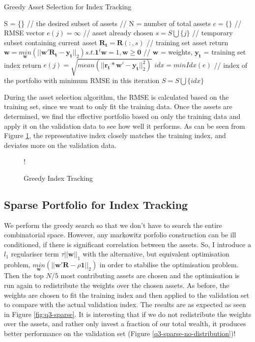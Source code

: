 \documentclass[11pt]{article}
\begin{document}
\begin{algorithm}[H]
\caption{Greedy Asset Selection for Index Tracking}
\label{alg:greedy-index}
\begin{algorithmic}
\State S = \{\} // the desired subset of assets
 // N = number of total assets
\State $e = \{\}$ // RMSE vector
\State $e(j) = \infty$ // asset already chosen
\Else
\State $s = S \bigcup \{j\}$ // temporary subset containing current asset
\State $\bm{R_t} = \bm{R}(:, s)$ // training set asset return
\State $\bm{w} = \underset{\bm{w}}{min}(||\bm{w}'\bm{R_t} - \bm{y_t}||_2) s.t. \bm{1}^t\bm{w} = 1, \bm{w} \geq \bm{0}$ // $\bm{w}$ = weights, $\bm{y_t}$ = training set index return
\State $e(j) = \sqrt{mean(||\bm{r_t} * \bm{w}' - \bm{y_t}||_2^2)}$
\EndIf
\EndFor
\State $idx = minIdx(e)$ // index of the portfolio with minimum RMSE in this iteration
\State $S = S \bigcup \{idx\}$
\EndFor
\end{algorithmic}
\end{algorithm}

During the asset selection algorithm, the RMSE is calculated based on the training set, since we want to only fit the
training data. Once the assets are determined, we find the effective portfolio based on only the training data and 
apply it on the validation data to see how well it performs. As can be seen from Figure \ref{fig:q3-greedy},
the representative index closely matches the training index, and deviates more on the validation data.

\begin{figure}[!h]
	\vspace{-0.5cm}
   \centering 
 	 {!} { }
    \caption{Greedy Index Tracking}
	\label{fig:q3-greedy}
	\vspace{-0.5cm}
\end{figure}

\subsection{Sparse Portfolio for Index Tracking}

We perform the greedy search so that we don't have to search the entire combinatorial space. However, any markowitz
porfolio construction can be ill conditioned, if there is significant correlation between the assets. So, I introduce
a $l_1$ regulariser term $\tau||\bm{w}||_1$ with the alternative, but equivalent optimisation problem, 
$\underset{\bm{w}}{min}(||\bm{w}'\bm{R} - \rho\bm{1}||_2)$ in order to stabilise the optimisation problem. Then the top
$N/5$ most contributing assets are chosen and the optimisation is run again to redistribute the weights over the 
chosen assets. As before, the weights are chosen to fit the training index and then applied to the validation set
to compare with the actual validation index. The results are as expected as seen in Figure \ref{fig:q3-sparse}.
It is interesting that if we do not redistribute the weights over the assets, and rather only invest a fraction of
our total wealth, it produces better performance on the validation set (Figure \ref{q3-sparse-no-distribution})!
\end{document}
